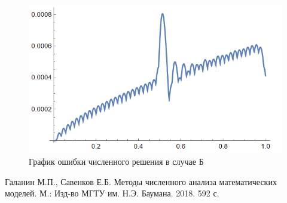 \documentclass[12pt, a4paper]{article}
\begin{document}
	\begin{figure}[H]
		\centering
		\includegraphics[width=1\textwidth]{errors2}
		\caption{График ошибки численного решения в случае Б}
	\end{figure}

	\clearpage
	\begin{thebibliography}{1}
		 Галанин М.П., Савенков Е.Б. Методы численного анализа математических моделей. М.: Изд-во МГТУ им. Н.Э. Баумана. 2018. 592 с.
		
	\end{thebibliography}
	
\end{document}
